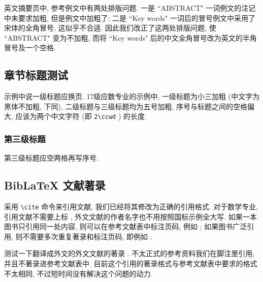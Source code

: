 英文摘要页中, 参考例文中有两处排版问题. 一是 ``ABSTRACT" 一词例文的注记中未要求加粗, 但是例文中加粗了; 二是 ``Key words" 一词后的冒号例文中采用了宋体的全角冒号, 这似乎不合适. 因此我们改正了这两处排版问题, 使 ``ABSTRACT" 变为不加粗, 而将 ``Key words" 后的中文全角冒号改为英文的半角冒号及一个空格.

\subsection{章节标题测试}

示例中说一级标题应换页. 17级应数专业的示例中, 一级标题为小三加粗 (中文字为黑体不加粗, 下同), 二级标题与三级标题均为五号加粗, 序号与标题之间的空格偏大, 应该为两个中文字符 (即 \verb|2\ccwd| ) 的长度.

\subsubsection{第三级标题}

第三级标题应空两格再写序号.

\zhlipsum[1]

\subsection{BibLaTeX 文献著录}

采用 \verb|\cite| 命令来引用文献, 我们已经将其修改为正确的引用格式. 对于数学专业, 引用文献不需要上标 \cite{atiyah_introduction_1969}, 外文文献的作者名字也不用按照国标示例全大写. 如果一本图书只引用同一处内容, 则可以在参考文献表中标注页码, 例如 \cite{herrlich_axiom_2006}; 如果图书广泛引用, 则不需要多次重复著录和标注页码, 即例如 \cite{atiyah_introduction_1969}.






测试一下翻译成外文的外文文献的著录 \cite{sally_history_1985}. 不太正式的参考资料我们在脚注里引用, 并且不著录进参考文献表中. 目前这个引用的著录格式与参考文献表中要求的格式不太相同, 不过短时间没有解决这个问题的动力.

